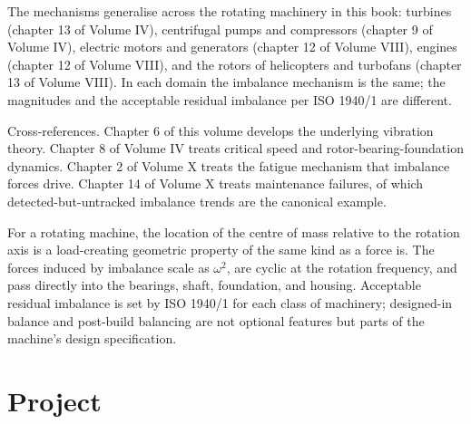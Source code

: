 The mechanisms generalise across the rotating machinery in this book:
turbines (chapter 13 of Volume IV), centrifugal pumps and compressors
(chapter 9 of Volume IV), electric motors and generators (chapter 12
of Volume VIII), engines (chapter 12 of Volume VIII), and the rotors
of helicopters and turbofans (chapter 13 of Volume VIII). In each
domain the imbalance mechanism is the same; the magnitudes and the
acceptable residual imbalance per ISO 1940/1 are different.

Cross-references. Chapter 6 of this volume develops the underlying
vibration theory. Chapter 8 of Volume IV treats critical speed and
rotor-bearing-foundation dynamics. Chapter 2 of Volume X treats the
fatigue mechanism that imbalance forces drive. Chapter 14 of Volume X
treats maintenance failures, of which detected-but-untracked imbalance
trends are the canonical example.

\begin{principle}
For a rotating machine, the location of the centre of mass relative
to the rotation axis is a load-creating geometric property of the
same kind as a force is. The forces induced by imbalance scale as
$\omega^2$, are cyclic at the rotation frequency, and pass directly
into the bearings, shaft, foundation, and housing. Acceptable
residual imbalance is set by ISO 1940/1 for each class of machinery;
designed-in balance and post-build balancing are not optional
features but parts of the machine's design specification.
\end{principle}

\section{Project}

